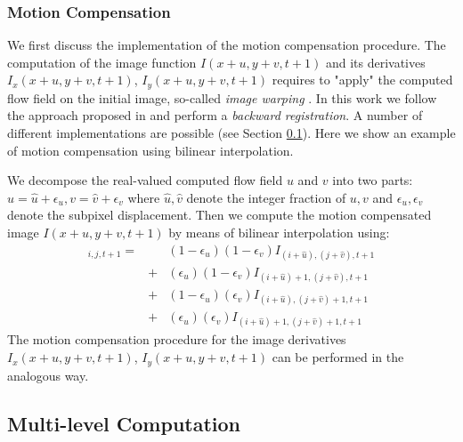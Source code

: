 


\subsubsection{Motion Compensation}
\label{compensation}

We first discuss the implementation of the motion compensation procedure. The computation of the image function $I(x+u, y+v, t+1)$ and its derivatives $I_x(x+u, y+v, t+1)$, $I_y(x+u, y+v, t+1)$ requires to "apply"  the computed flow field on the initial image, so-called \textit{image warping} \cite{Memin98}.  In this work we follow the approach proposed in \cite{Memin98, Brox04} and perform a \textit{backward registration}. A number of different implementations are possible (see Section \ref{multilevel}). Here we show an example of motion compensation using bilinear interpolation.

We decompose the real-valued computed flow field $u$ and $v$ into two parts: $u = \hat{u}  + \epsilon_u, v = \hat{v}  + \epsilon_v$ where $\hat{u}, \hat{v}$ denote the integer fraction of $u, v$ and $\epsilon_u, \epsilon_v$ denote the subpixel displacement. Then we compute the motion compensated image $I(x+u,y+v,t+1)$ by means of bilinear interpolation using:
\begin{eqnarray*}
[I(x+u,y+v,t+1)]_{i,j,t+1} = & & (1-\epsilon_u)(1 - \epsilon_v) I_{(i+\hat{u}),(j+\hat{v}), t+1} \\
&+& ( \epsilon_u)(1 - \epsilon_v) I_{(i+\hat{u}) + 1,(j+\hat{v}), t+1} \\
&+& (1-\epsilon_u)(\epsilon_v) I_{(i+\hat{u}),(j+\hat{v})+1, t+1}  \\
&+& (\epsilon_u)(\epsilon_v) I_{(i+\hat{u})+1,(j+\hat{v})+1, t+1} 
\end{eqnarray*}
The motion compensation procedure for the image derivatives $I_x(x+u,y+v,t+1)$, $I_y(x+u,y+v,t+1)$ can be performed in the analogous way.

\subsection{Multi-level Computation}
\label{multilevel}

